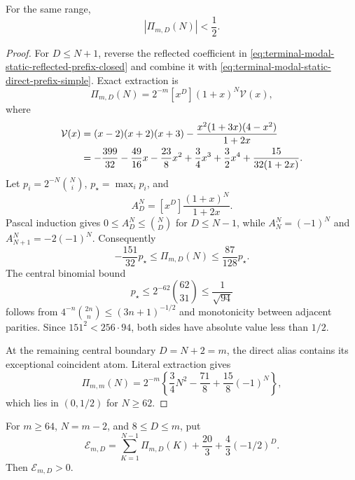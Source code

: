 \begin{lemma}
\label{lem:terminal-modal-static-terminal-prefix}
For the same range,
\begin{equation}
 |\Pi_{m,D}(N)|<\frac12.
 \label{eq:terminal-modal-static-terminal-prefix}
\end{equation}
\end{lemma}

\begin{proof}
For $D\le N+1$, reverse the reflected coefficient in
\eqref{eq:terminal-modal-static-reflected-prefix-closed} and combine it with
\eqref{eq:terminal-modal-static-direct-prefix-simple}.  Exact extraction is
\begin{equation}
 \Pi_{m,D}(N)=2^{-m}[x^D](1+x)^N\mathcal V(x),
 \label{eq:terminal-modal-static-terminal-prefix-gf}
\end{equation}
where
\begin{align}
 \mathcal V(x)
 &=(x-2)(x+2)(x+3)
 -\frac{x^2(1+3x)(4-x^2)}{1+2x}\notag\\
 &=-\frac{399}{32}-\frac{49}{16}x-\frac{23}{8}x^2
 +\frac34x^3+\frac32x^4+\frac{15}{32(1+2x)}.
 \label{eq:terminal-modal-static-terminal-prefix-partial}
\end{align}
Let $p_i=2^{-N}\binom Ni$, $p_\star=\max_i p_i$, and
\[
 A_D^N=[x^D]\frac{(1+x)^N}{1+2x}.
\]
Pascal induction gives $0\le A_D^N\le\binom ND$ for $D\le N-1$, while
$A_N^N=(-1)^N$ and $A_{N+1}^N=-2(-1)^N$.  Consequently
\[
 -\frac{151}{32}p_\star\le\Pi_{m,D}(N)
 \le\frac{87}{128}p_\star.
\]
The central binomial bound
\[
 p_\star\le2^{-62}\binom{62}{31}\le\frac1{\sqrt{94}}
\]
follows from
$4^{-n}\binom{2n}{n}\le(3n+1)^{-1/2}$ and monotonicity between adjacent
parities.  Since $151^2<256\cdot94$, both sides have absolute value less
than $1/2$.

At the remaining central boundary $D=N+2=m$, the direct alias contains its
exceptional coincident atom.  Literal extraction gives
\[
 \Pi_{m,m}(N)=2^{-m}
 \left\{\frac34N^2-\frac{71}{8}+\frac{15}{8}(-1)^N\right\},
\]
which lies in $(0,1/2)$ for $N\ge62$.
\end{proof}

\begin{lemma}
\label{lem:terminal-modal-static-folded-tail}
For $m\ge64$, $N=m-2$, and $8\le D\le m$, put
\[
 \mathcal E_{m,D}=\sum_{K=1}^{N-1}\Pi_{m,D}(K)
 +\frac{20}{3}+\frac43(-1/2)^D.
\]
Then $\mathcal E_{m,D}>0$.
\end{lemma}

